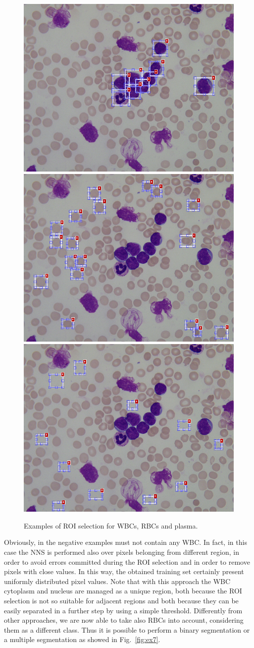 \documentclass[final,a4paper,12pt,english]{UnicaPhdThesis3}
\begin{document}
	\begin{figure}[!b]
		\centering
		\includegraphics[height=0.25\textwidth]{images/2015_1_caip/ROI1}
		\includegraphics[height=0.25\textwidth]{images/2015_1_caip/ROI2}
		\includegraphics[height=0.25\textwidth]{images/2015_1_caip/ROI3}
		\caption{\label{fig:ex6}Examples of ROI selection for WBCs, RBCs and plasma.}
	\end{figure}
	
	Obviously, in the negative examples must not contain any WBC. In fact, in this case the NNS is performed also over pixels belonging from different region, in order to avoid errors committed during the ROI selection and in order to remove pixels with close values. In this way, the obtained training set certainly present uniformly distributed pixel values. Note that with this approach the WBC cytoplasm and nucleus are managed as a unique region, both because the ROI selection is not so suitable for adjacent regions and both because they can be easily separated in a further step by using a simple threshold. Differently from other approaches, we are now able to take also RBCs into account, considering them as a different class.
	Thus it is possible to perform a binary segmentation or a multiple segmentation as showed in Fig.~\ref{fig:ex7}.
	
\end{document}
